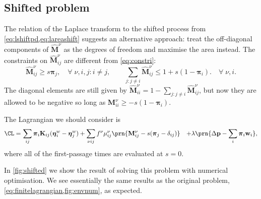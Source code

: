 \documentclass[12pt]{article}
\newcommand{\pr}{\mathbf{p}}
\newcommand{\eq}{\pib}
\newcommand{\pib}{\boldsymbol{\pi}}
\newcommand{\etw}{\boldsymbol{\eta}^w}
\newcommand{\w}{\mathbf{w}}
\newcommand{\M}{\mathbf{M}}
\newcommand{\enc}{\mathbf{K}}
\newcommand{\shift}[1]{\widehat{#1}}
\begin{document}

\subsection{Shifted problem}\label{sec:lshift}

The relation of the Laplace transform to the shifted process from \cref{eq:lshiftpd,eq:lareashift} suggests an alternative approach: 
treat the off-diagonal components of \(\shift{\M}^\nu \) as the degrees of freedom and maximise the area instead.
The constraints on \(\shift{\M}^\nu_{ij}\) are different from \cref{eq:constri}:
%
\begin{equation}\label{eq:lshiftconstr}
  \shift{\M}^\nu_{ij} \geq s \eq_j,
    \quad \forall \; \nu, i, j : i \neq j, \qquad
  \sum_{j: j \neq i} \shift{\M}^\nu_{ij} \leq 1 + s (1 - \eq_i).
    \quad \forall \; \nu, i.
\end{equation}
%
The diagonal elements are still given by \( \shift{\M}^\nu_{ii} = 1 - \sum_{j: j \neq i} \shift{\M}^\nu_{ij} \), but now they are allowed to be negative so long as \(\M^\nu_{ii} \geq - s (1 - \eq_i)\).

The Lagrangian we should consider is
%
\begin{equation}\label{eq:lshiftlagrangian}
\begin{aligned}
  \CL =&\, \sum_{ij} \eq_i \enc_{ij} (\etw_i - \etw_j)
        +\sum_{\nu i j}  f^\nu \mu^\nu_{ij}\prn{\M^\nu_{ij} -  s (\eq_j - \delta_{ij}) }
        &+ \lambda \prn{ \Delta\pr - \sum_i \eq_i \w_i },
\end{aligned}
\end{equation}
%
where all of the first-passage times are evaluated at \(s = 0\).

In \cref{fig:shifted} we show the result of solving this problem with numerical optimisation.
We see essentially the same results as the original problem, \cref{eq:finitelagrangian,fig:envnum}, as expected.
\end{document}

